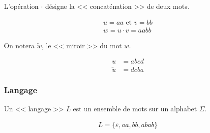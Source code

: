 \begin{frame}{\myframetitle}
  \begin{definition}
    L'opération \(\cdot\) désigne la << concaténation >> de deux mots.
  \end{definition}

  \pause[]

  \begin{example}
    \centering
    \vspace{-1.5\topsep}
    \begin{gather*}
      u = aa \text{ et } v = bb \\
      w = u \cdot v = aabb
    \end{gather*}
  \end{example}
\end{frame}

\begin{frame}{\myframetitle}
  \begin{definition}
    On notera \(\overleftarrow w\), le << miroir >> du mot \(w\).
  \end{definition}

  \pause[]

  \begin{example}
    \vspace{-1.5\topsep}
    \begin{align*}
      u &= abcd\\
      \overleftarrow u &= dcba
    \end{align*}
  \end{example}
\end{frame}

\subsubsection{Langage}


\begin{frame}{\myframetitle}
  \begin{definition}[Langage]
    Un << langage >> \(L\) est un ensemble de mots sur un alphabet \(\Sigma\).
  \end{definition}

  \pause[]

  \begin{example}
    \vspace{-1.5\topsep}
    \begin{gather*}
      L = \{\varepsilon, aa, bb, abab\}
    \end{gather*}
  \end{example}
\end{frame}

